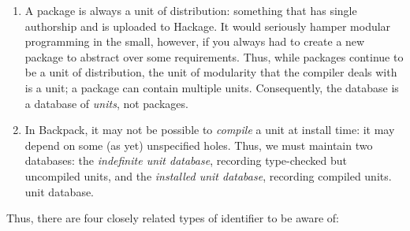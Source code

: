 \documentclass{article}
\begin{document}
\begin{enumerate}
    \item A package is always a unit of distribution: something that has
    single authorship and is uploaded to Hackage.  It would seriously hamper
    modular programming in the small, however, if you always had to create
    a new package to abstract over some requirements.  Thus, while packages
    continue to be a unit of distribution, the unit of modularity that the
    compiler deals with is a unit; a package can contain multiple units.
    Consequently, the database is a database of \emph{units}, not packages.
    \item  In Backpack, it may not be possible to \emph{compile} a unit
    at install time: it may depend on some (as yet) unspecified holes.
    Thus, we must maintain two databases: the \emph{indefinite unit
    database}, recording type-checked but uncompiled units, and the
    \emph{installed unit database}, recording compiled units.  unit
    database.
\end{enumerate}
%
Thus, there are four closely related types of identifier to be aware of:
\end{document}
